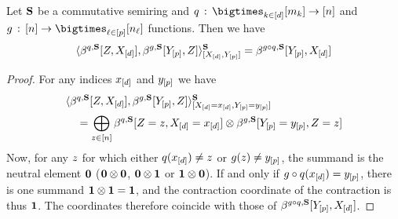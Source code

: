 \begin{theorem}
    Let $\mathbf{S}$ be a commutative semiring and $\exfunction \wcols \facstates \rightarrow [\thirdcatdim]$ and $\secexfunction \wcols [\thirdcatdim] \rightarrow \headstates$ functions.
    Then we have
    \begin{align*}
        \langle
            \beta^{q,\mathbf{S}}[Z,X_{[d]}],
            \beta^{g,\mathbf{S}}[Y_{[p]},Z]
        \rangle^{\mathbf{S}}_{[
            X_{[d]},Y_{[p]}
        ]}
        =\beta^{g\circ q,\mathbf{S}}[Y_{[p]},X_{[d]}]
    \end{align*}
\end{theorem}
\begin{proof}
    For any indices $x_{[d]}$ and $y_{[p]}$ we have
    \begin{align*}
        &\langle
            \beta^{q,\mathbf{S}}[Z,X_{[d]}],
            \beta^{g,\mathbf{S}}[Y_{[p]},Z]
        \rangle^{\mathbf{S}}_{[
            X_{[d]}=x_{[d]},Y_{[p]}=y_{[p]}
        ]} \\
        &\quad=
        \bigoplus_{z\in[n]}
        \beta^{q,\mathbf{S}}[Z=z,X_{[d]}=x_{[d]}] \otimes
        \beta^{g,\mathbf{S}}[Y_{[p]}=y_{[p]},Z=z]
    \end{align*}
    Now, for any $z$ for which either $q(x_{[d]})\neq z$ or $g(z)\neq y_{[p]}$, the summand is the neutral element $\mathbf{0}$ ($\mathbf{0}\otimes\mathbf{0}$, $\mathbf{0}\otimes\mathbf{1}$ or $\mathbf{1}\otimes\mathbf{0}$).
    If and only if $g\circ q(x_{[d]})=y_{[p]}$, there is one summand $\mathbf{1}\otimes\mathbf{1}=\mathbf{1}$, and the contraction coordinate of the contraction is thus $\mathbf{1}$.
    The coordinates therefore coincide with those of $\beta^{g\circ q,\mathbf{S}}[Y_{[p]},X_{[d]}]$.
\end{proof}